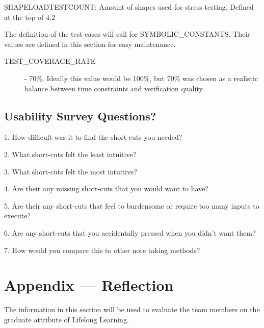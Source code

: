\documentclass[12pt, titlepage]{article}
\begin{document}
SHAPELOADTESTCOUNT: Amount of shapes used for stress testing. Defined at the top of 4.2



The definition of the test cases will call for SYMBOLIC\_CONSTANTS.
Their values are defined in this section for easy maintenance.\\

\begin{description}
  \item[TEST\_COVERAGE\_RATE] - 70\%. Ideally this value would be 100\%, but 70\% was chosen as a realistic balance between time constraints and verification quality.
\end{description}

\subsection{Usability Survey Questions?}


1. How difficult was it to find the short-cuts you needed?

2. What short-cuts felt the least intuitive? 

3. What short-cuts felt the most intuitive? 

4. Are their any missing short-cuts that you would want to have?

5. Are their any short-cuts that feel to burdensome or require too many inputs to execute?

6. Are any short-cuts that you accidentally pressed when you didn't want them?

7. How would you compare this to other note taking methods?

\newpage{}
\section*{Appendix --- Reflection}


The information in this section will be used to evaluate the team members on the
graduate attribute of Lifelong Learning.


\end{document}
